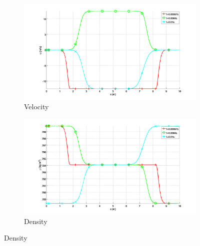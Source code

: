 \documentclass{mc2015}
\begin{document}
\begin{figure}[H]
        \centering
        \begin{subfigure}[b]{0.5\textwidth}
                \centering
                \includegraphics[width=\textwidth]{figures/Plot_velocity_single_phase.png}
                \caption{Velocity}
                \label{fig:single-phase-vel}
        \end{subfigure}%
        \begin{subfigure}[b]{0.5\textwidth}
                \centering
                \includegraphics[width=\textwidth]{figures/Plot_density_single_phase.png}
                \caption{Density}
                \label{fig:single-phase-density}
        \end{subfigure}
        

\end{figure}
\end{document}
